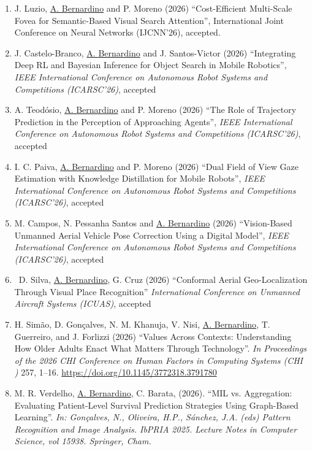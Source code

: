 \documentclass[
]{article}
\begin{document}
\begin{enumerate}
\def\labelenumi{\arabic{enumi}.}
\item
  J. Luzio, \ul{A. Bernardino} and P. Moreno (2026) ``Cost-Efficient
  Multi-Scale Fovea for Semantic-Based Visual Search Attention'',
  International Joint Conference on Neural Networks (IJCNN'26),
  accepted.
\item
  J. Castelo-Branco, \ul{A. Bernardino} and J. Santos-Victor (2026)
  ``Integrating Deep RL and Bayesian Inference for Object Search in
  Mobile Robotics'', \emph{IEEE International Conference on Autonomous
  Robot Systems and Competitions (ICARSC'26)}, accepted
\item
  A. Teodósio, \ul{A. Bernardino} and P. Moreno (2026) ``The Role of
  Trajectory Prediction in the Perception of Approaching Agents'',
  \emph{IEEE International Conference on Autonomous Robot Systems and
  Competitions (ICARSC'26)}, accepted
\item
  I. C. Paiva, \ul{A. Bernardino} and P. Moreno (2026) ``Dual Field of
  View Gaze Estimation with Knowledge Distillation for Mobile Robots'',
  \emph{IEEE International Conference on Autonomous Robot Systems and
  Competitions (ICARSC'26)}, accepted
\item
  M. Campos, N. Pessanha Santos and \ul{A. Bernardino} (2026)
  ``Vision-Based Unmanned Aerial Vehicle Pose Correction Using a Digital
  Model'', \emph{IEEE International Conference on Autonomous Robot
  Systems and Competitions (ICARSC'26)}, accepted
\item
  ~D. Silva, \ul{A. Bernardino}, G. Cruz (2026) ``Conformal Aerial
  Geo-Localization Through Visual Place Recognition''
  \emph{International Conference on Unmanned Aircraft Systems (ICUAS)},
  accepted
\item
  H. Simão, D. Gonçalves, N. M. Khanuja, V. Nisi, \ul{A. Bernardino}, T.
  Guerreiro, and J. Forlizzi (2026) ``Values Across Contexts:
  Understanding How Older Adults Enact What Matters Through
  Technology''. \emph{In Proceedings of the 2026 CHI Conference on Human
  Factors in Computing Systems (CHI )} 257, 1--16.
  \url{https://doi.org/10.1145/3772318.3791780}
\item
  M. R. Verdelho, \ul{A. Bernardino}, C. Barata, (2026). ``MIL vs.
  Aggregation: Evaluating Patient-Level Survival Prediction Strategies
  Using Graph-Based Learning''. \emph{In: Gonçalves, N., Oliveira, H.P.,
  Sánchez, J.A. (eds) Pattern Recognition and Image Analysis. IbPRIA
  2025. Lecture Notes in Computer Science, vol 15938. Springer, Cham.}

\end{enumerate}
\end{document}
